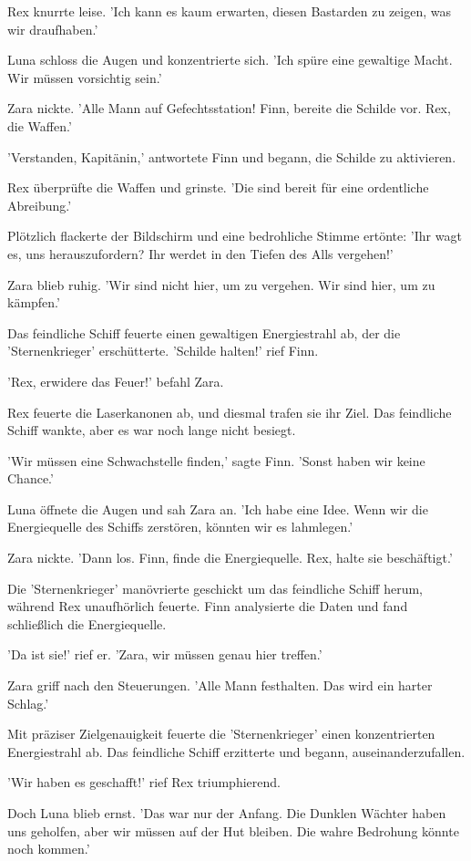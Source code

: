 \documentclass[12pt]{article}
\begin{document}
Rex knurrte leise. 'Ich kann es kaum erwarten, diesen Bastarden zu zeigen, was wir draufhaben.'

Luna schloss die Augen und konzentrierte sich. 'Ich spüre eine gewaltige Macht. Wir müssen vorsichtig sein.'

Zara nickte. 'Alle Mann auf Gefechtsstation! Finn, bereite die Schilde vor. Rex, die Waffen.'

'Verstanden, Kapitänin,' antwortete Finn und begann, die Schilde zu aktivieren.

Rex überprüfte die Waffen und grinste. 'Die sind bereit für eine ordentliche Abreibung.'

Plötzlich flackerte der Bildschirm und eine bedrohliche Stimme ertönte: 'Ihr wagt es, uns herauszufordern? Ihr werdet in den Tiefen des Alls vergehen!'

Zara blieb ruhig. 'Wir sind nicht hier, um zu vergehen. Wir sind hier, um zu kämpfen.'

Das feindliche Schiff feuerte einen gewaltigen Energiestrahl ab, der die 'Sternenkrieger' erschütterte. 'Schilde halten!' rief Finn.

'Rex, erwidere das Feuer!' befahl Zara.

Rex feuerte die Laserkanonen ab, und diesmal trafen sie ihr Ziel. Das feindliche Schiff wankte, aber es war noch lange nicht besiegt.

'Wir müssen eine Schwachstelle finden,' sagte Finn. 'Sonst haben wir keine Chance.'

Luna öffnete die Augen und sah Zara an. 'Ich habe eine Idee. Wenn wir die Energiequelle des Schiffs zerstören, könnten wir es lahmlegen.'

Zara nickte. 'Dann los. Finn, finde die Energiequelle. Rex, halte sie beschäftigt.'

Die 'Sternenkrieger' manövrierte geschickt um das feindliche Schiff herum, während Rex unaufhörlich feuerte. Finn analysierte die Daten und fand schließlich die Energiequelle.

'Da ist sie!' rief er. 'Zara, wir müssen genau hier treffen.'

Zara griff nach den Steuerungen. 'Alle Mann festhalten. Das wird ein harter Schlag.'

Mit präziser Zielgenauigkeit feuerte die 'Sternenkrieger' einen konzentrierten Energiestrahl ab. Das feindliche Schiff erzitterte und begann, auseinanderzufallen.

'Wir haben es geschafft!' rief Rex triumphierend.

Doch Luna blieb ernst. 'Das war nur der Anfang. Die Dunklen Wächter haben uns geholfen, aber wir müssen auf der Hut bleiben. Die wahre Bedrohung könnte noch kommen.'
\end{document}
